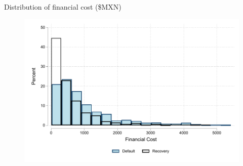 \documentclass[8pt]{beamer}
\begin{document}
\begin{frame}{Distribution of financial cost (\$MXN)}
    \begin{figure}
     \centering
        \includegraphics[width=.8\textwidth]{Figuras/hist_fc.pdf}
    \end{figure}
    
    \hyperlink{fc_outcome}{}

\end{frame}
\end{document}
